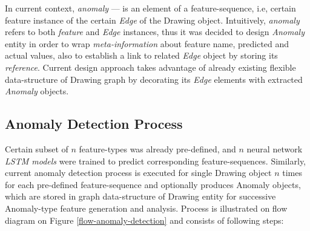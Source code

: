 In current context, \textit{anomaly} --- is an element of a feature-sequence, i.e, certain feature instance of the certain \textit{Edge} of the Drawing object. Intuitively, \textit{anomaly} refers to both \textit{feature} and \textit{Edge} instances, thus it was decided to design \textit{Anomaly} entity in order to wrap \textit{meta-information} about feature name, predicted and actual values, also to establish a link to related \textit{Edge} object by storing its \textit{reference}. Current design approach takes advantage of already existing flexible data-structure of Drawing graph by decorating its \textit{Edge} elements with extracted \textit{Anomaly} objects.

\subsection{Anomaly Detection Process}

Certain subset of $n$ feature-types was already pre-defined, and $n$ neural network \textit{LSTM models} were trained to predict corresponding feature-sequences. Similarly, current anomaly detection process is executed for single Drawing object $n$ times for each pre-defined feature-sequence and optionally produces Anomaly objects, which are stored in graph data-structure of Drawing entity for successive Anomaly-type feature generation and analysis. Process is illustrated on flow diagram on Figure \ref{flow-anomaly-detection} and consists of following steps:

